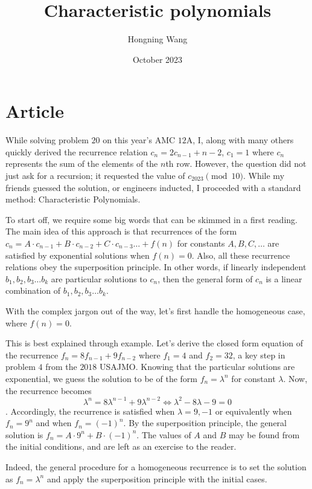 \documentclass{article}
\title{Characteristic polynomials}
\author{Hongning Wang}
\date{October 2023}
\begin{document}
\maketitle

\section{Article}
While solving problem $20$ on this year's AMC $12$A, I, along with many others quickly derived the recurrence relation $c_n = 2c_{n-1}+n-2$, $c_1 = 1$ where $c_n$ represents the sum of the elements of the $n$th row. However, the question did not just ask for a recursion; it requested the value of $c_{2023} \pmod{10}.$ While my friends guessed the solution, or engineers inducted, I proceeded with a standard method: Characteristic Polynomials.

To start off, we require some big words that can be skimmed in a first reading. The main idea of this approach is that recurrences of the form $c_n = A\cdot c_{n-1} + B \cdot c_{n-2} + C \cdot c_{n-3} \dots + f(n)$ for constants $A, B, C, \dots$ are satisfied by exponential solutions when $f(n) = 0$. Also, all these recurrence relations obey the superposition principle. In other words, if linearly independent $b_1, b_2, b_3 \dots b_k$ are particular solutions to $c_n$, then the general form of $c_n$ is a linear combination of $b_1, b_2, b_3 \dots b_k$.

With the complex jargon out of the way, let's first handle the homogeneous case, where $f(n) = 0.$ 

This is best explained through example. Let's derive the closed form equation of the recurrence $f_n = 8f_{n-1} + 9f_{n-2}$ where $f_1 = 4$ and $f_2 = 32$, a key step in problem $4$ from the $2018$ USAJMO. Knowing that the particular solutions are exponential, we guess the solution to be of the form $f_n = \lambda^n$ for constant $\lambda.$ Now, the recurrence becomes \[\lambda^n = 8\lambda^{n-1} + 9\lambda^{n-2} \Longleftrightarrow \lambda^2 - 8 \lambda - 9 = 0\]. Accordingly, the recurrence is satisfied when $\lambda = 9, -1$ or equivalently when $f_n = 9^n$ and when $f_n = (-1)^n.$ By the superposition principle, the general solution is $f_n = A \cdot 9^n + B \cdot (-1)^n.$ The values of $A$ and $B$ may be found from the initial conditions, and are left as an exercise to the reader. 

Indeed, the general procedure for a homogeneous recurrence is to set the solution as $f_n = \lambda^n$ and apply the superposition principle with the initial cases. 
\end{document}
